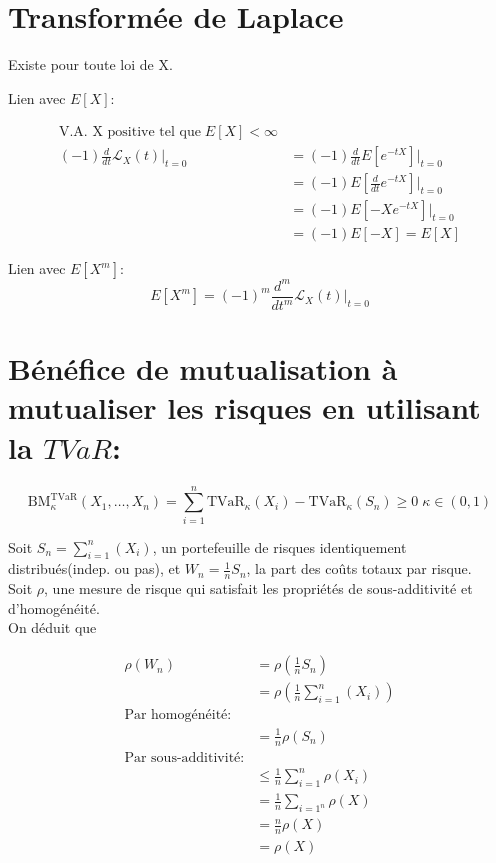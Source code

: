 \documentclass[]{book}
\theoremstyle{definition}
\theoremstyle{definition}
\theoremstyle{definition}
\theoremstyle{remark}
\begin{document}
\section{Transformée de Laplace}\label{transformee-de-laplace}

Existe pour toute loi de X.

Lien avec \(E[X]\):

\begin{align*}
\text{V.A. X positive tel que}\; E[X]<\infty& \\ 
(-1)\frac{d}{dt}\mathcal{L}_X(t)\vert_{t=0}& =(-1)\frac{d}{dt}E\left[e^{-tX}\right]\vert_{t=0}\\
& =(-1)E\left[\frac{d}{dt}e^{-tX}\right]\vert_{t=0}\\
& =(-1)E\left[-Xe^{-tX}\right]\vert_{t=0}\\
& =(-1)E[-X] = E[X]
\end{align*}

Lien avec \(E[X^m]\): \[
E[X^m]=(-1)^m\frac{d^m}{dt^m}\mathcal{L}_X(t)\vert_{t=0}
\]

\section{\texorpdfstring{Bénéfice de mutualisation à mutualiser les
risques en utilisant la
\(TVaR\):}{Bénéfice de mutualisation à mutualiser les risques en utilisant la TVaR:}}\label{benefice-de-mutualisation-a-mutualiser-les-risques-en-utilisant-la-tvar}

\[
\text{BM}^{\text{TVaR}}_\kappa(X_1,\dots,X_n)=\sum^n_{i=1}\text{TVaR}_\kappa(X_i) -\text{TVaR}_\kappa(S_n)\geq0\;\kappa\in(0,1)
\]

Soit \(S_n=\sum^n_{i=1}(X_i)\), un portefeuille de risques identiquement
distribués(indep. ou pas), et \(W_n=\frac{1}{n}S_n\), la part des coûts
totaux par risque.\\
Soit \(\rho\), une mesure de risque qui satisfait les propriétés de
sous-additivité et d'homogénéité.\\
On déduit que

\begin{align*}
\rho(W_n)& = \rho\left(\frac{1}{n}S_n\right)\\
& =\rho\left(\frac{1}{n}\sum_{i=1}^n (X_i)\right)\\
\text{Par homogénéité:}\\
& =\frac{1}{n}\rho(S_n)\\
\text{Par sous-additivité:}\\
& \leq\frac{1}{n} \sum^n_{i=1}\rho(X_i)\\
& =\frac{1}{n} \sum_{i=1^n}\rho(X)\\
& =\frac{n}{n}\rho(X)\\
& =\rho(X)
\end{align*}
\end{document}
